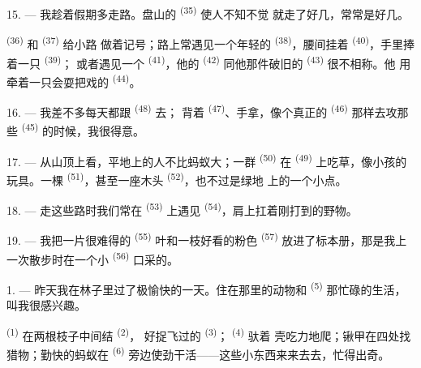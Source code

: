 15. --- 我趁着假期多走路。盘山的 \textsuperscript{(35)} 使人不知不觉
就走了好几，常常是好几。

 \textsuperscript{(36)} 和 \textsuperscript{(37)} 给小路
做着记号；路上常遇见一个年轻的 \textsuperscript{(38)}，腰间挂着
 \textsuperscript{(40)}，手里捧着一只 \textsuperscript{(39)}；
或者遇见一个 \textsuperscript{(41)}，他的
\textsuperscript{(42)} 同他那件破旧的 \textsuperscript{(43)} 很不相称。他
用牵着一只会耍把戏的 \textsuperscript{(44)}。

\VUsaut{3.0mm}

16. --- 我差不多每天都跟 \textsuperscript{(48)} 去；
背着 \textsuperscript{(47)}、手拿，像个真正的
 \textsuperscript{(46)} 那样去攻那些 \textsuperscript{(45)}
的时候，我很得意。

17. --- 从山顶上看，平地上的人不比蚂蚁大；一群 \textsuperscript{(50)} 在
\textsuperscript{(49)} 上吃草，像小孩的玩具。一棵
\textsuperscript{(51)}，甚至一座木头 \textsuperscript{(52)}，也不过是绿地
上的一个小点。

18. --- 走这些路时我们常在 \textsuperscript{(53)} 上遇见
 \textsuperscript{(54)}，肩上扛着刚打到的野物。

19. --- 我把一片很难得的 \textsuperscript{(55)} 叶和一枝好看的粉色
 \textsuperscript{(57)} 放进了标本册，那是我上一次散步时在一个小
 \textsuperscript{(56)} 口采的。

\VUsaut{3.0mm}
\VUsaut{3.0mm}

\VUsaut{3.0mm}

1. --- 昨天我在林子里过了极愉快的一天。住在那里的动物和
\textsuperscript{(5)} 那忙碌的生活，叫我很感兴趣。

 \textsuperscript{(1)} 在两根枝子中间结 \textsuperscript{(2)}，
好捉飞过的 \textsuperscript{(3)}； \textsuperscript{(4)} 驮着
壳吃力地爬；锹甲在四处找猎物；勤快的蚂蚁在 \textsuperscript{(6)}
旁边使劲干活——这些小东西来来去去，忙得出奇。

